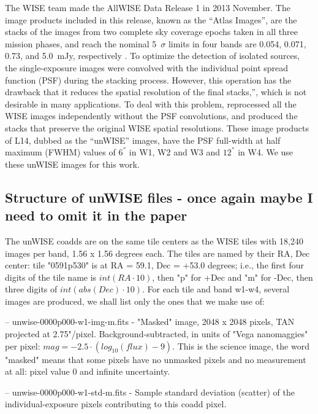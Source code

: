 \documentclass[numberedappendix,apj,twocolumn]{emulateapj}
\begin{document}
The WISE team made the AllWISE Data Release 1 in 2013 November. The image products included in this release, known as the ``Atlas Images'', are the stacks of the images from two complete sky coverage epochs taken in all three mission phases, and reach the nominal 5~$\sigma$ limits in four bands are 0.054, 0.071, 0.73, and 5.0~mJy, respectively \citep[see][for details]{2013wise.rept....1C}. To optimize the detection of isolated sources, the single-exposure images were convolved with the individual point spread function (PSF) during the stacking process. However, this operation has the drawback that it reduces the spatial resolution of the final stacks,”, which is not desirable in many applications. To deal with this problem, \citet[][hereafter L14]{Lang2014e} reprocessed all the WISE images independently without the PSF convolutions, and produced the stacks that preserve the original WISE spatial resolutions. These image products of L14,  dubbed as the ``unWISE'' images, have the PSF full-width at half maximum (FWHM) values of $6^{''}$ in W1, W2 and W3 and $12^{''}$ in W4. We use these unWISE images for this work.


\subsection{Structure of unWISE files - once again maybe I need to omit it in the paper}

The unWISE coadds are on the same tile centers as the WISE tiles with 18,240 images per band, 1.56 x 1.56 degrees each. The tiles are named by their RA, Dec center: tile "0591p530" is at RA = 59.1, Dec = +53.0 degrees; i.e., the first four digits of the tile name is $int(RA \cdot 10)$, then "p" for +Dec and "m" for -Dec, then three digits of $int(abs(Dec)\cdot 10)$. For each tile and band w1-w4, several images are produced, we shall list only the ones that we make use of:

-- unwise-0000p000-w1-img-m.fits - "Masked" image, 2048 x 2048 pixels, TAN projected at 2.75"/pixel. Background-subtracted, in units of "Vega nanomaggies" per pixel: $mag = -2.5 \cdot (log_{10}(flux) - 9)$. This is the science image, the word "masked" means that some pixels have no unmasked pixels and no measurement at all: pixel value 0 and infinite uncertainty.

-- unwise-0000p000-w1-std-m.fits - Sample standard deviation (scatter) of the individual-exposure pixels  contributing to this coadd pixel.\\
\end{document}
